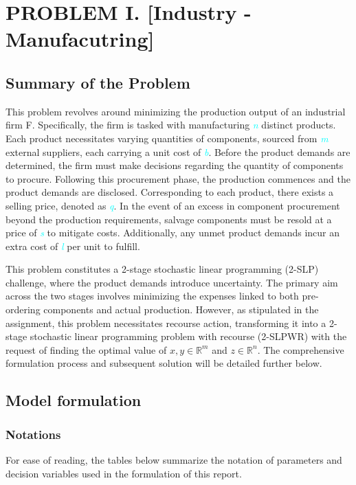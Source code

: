 \newpage
\section{PROBLEM I. [Industry - Manufacutring]}
	\subsection{Summary of the Problem}

	\qquad This problem revolves around minimizing the production output of an industrial firm F. Specifically, the firm is tasked with manufacturing \textcolor{cyan}{\textit{n}} distinct products. Each product necessitates varying quantities of components, sourced from \textcolor{cyan}{\textit{m}} external suppliers, each carrying a unit cost of \textcolor{cyan}{\textit{b}}. Before the product demands are determined, the firm must make decisions regarding the quantity of components to procure. Following this procurement phase, the production commences and the product demands are disclosed. Corresponding to each product, there exists a selling price, denoted as \textcolor{cyan}{\textit{q}}. In the event of an excess in component procurement beyond the production requirements, salvage components must be resold at a price of \textcolor{cyan}{\textit{s}} to mitigate costs. Additionally, any unmet product demands incur an extra cost of \textcolor{cyan}{\textit{l}} per unit to fulfill.

	\qquad This problem constitutes a 2-stage stochastic linear programming (2-SLP) challenge, where the product demands introduce uncertainty. The primary aim across the two stages involves minimizing the expenses linked to both pre-ordering components and actual production. However, as stipulated in the assignment, this problem necessitates recourse action, transforming it into a 2-stage stochastic linear programming problem with recourse (2-SLPWR) with the request of finding the optimal value of $x,y \in \mathbb{R}^m$ and $z \in \mathbb{R}^n$. The comprehensive formulation process and subsequent solution will be detailed further below.
	
	\subsection{Model formulation}
		\subsubsection{Notations}
		
		\qquad For ease of reading, the tables below summarize the notation of parameters and decision variables used in 
the formulation of this report.

